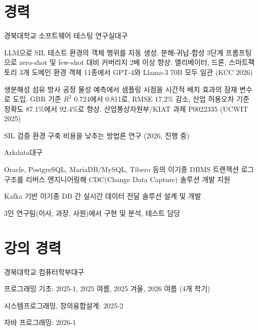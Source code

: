 \documentclass[korean,small]{cv}
\begin{document}
\section{경력}
  {경북대학교 소프트웨어 테스팅 연구실}{대구}
  {\begin{cvitems}
     \item LLM으로 SIL 테스트 환경의 객체 행위를 자동 생성. 분해-귀납-합성 3단계 프롬프팅으로
           zero-shot 및 few-shot 대비 커버리지 2배 이상 향상. 엘리베이터, 드론, 스마트팩토리
           3개 도메인 환경 객체 11종에서 GPT-4와 Llama-3 70B 모두 일관 (KCC 2026)
     \item 생분해성 섬유 방사 공정 물성 예측에서 샘플링 시점을 시간적 배치 효과의 잠재 변수로
           도입. GBR 기준 $R^2$ 0.724에서 0.811로, RMSE 17.2\% 감소, 산업 허용오차 기준
           정확도 87.1\%에서 92.4\%로 향상. 산업통상자원부/KIAT 과제 P0022335 (UCWIT 2025)
     \item SIL 검증 환경 구축 비용을 낮추는 방법론 연구 (2026, 진행 중)
   \end{cvitems}}

  {Arkdata}{대구}
  {\begin{cvitems}
     \item Oracle, PostgreSQL, MariaDB/MySQL, Tibero 등의 이기종 DBMS 트랜잭션 로그
           구조를 리버스 엔지니어링해 CDC(Change Data Capture) 솔루션 개발 지원
     \item Kafka 기반 이기종 DB 간 실시간 데이터 전달 솔루션 설계 및 개발
     \item 3인 연구팀(이사, 과장, 사원)에서 구현 및 분석, 테스트 담당
   \end{cvitems}}

\section{강의 경력}
  {경북대학교 컴퓨터학부}{대구}
  {\begin{cvitems}
     \item 프로그래밍 기초: 2025-1, 2025 여름, 2025 겨울, 2026 여름 (4개 학기)
     \item 시스템프로그래밍, 창의융합설계: 2025-2
     \item 자바 프로그래밍: 2026-1
   \end{cvitems}}
\end{document}
